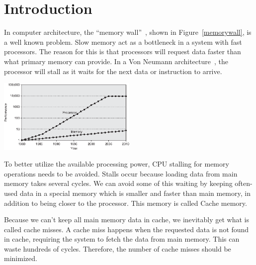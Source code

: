 \section{Introduction} %


In computer architecture, the ``memory wall''~\cite{wulf_mckee_1995},
shown in Figure~\ref{memorywall}, is a well known problem. Slow memory
act as a bottleneck in a system with fast processors. The reason for
this is that processors will request data faster than what primary
memory can provide. In a Von Neumann architecture~\cite{von1993first},
the processor will stall as it waits for the next data or instruction
to arrive.

\begin{center}
  \includegraphics[width=0.5\textwidth]{graphs/memorywall}
  \label{memorywall}
\end{center}

To better utilize the available processing power, CPU stalling for
memory operations needs to be avoided. Stalls occur because loading
data from main memory takes several cycles. We can avoid some of this
waiting by keeping often-used data in a special memory which is
smaller and faster than main memory, in addition to being closer to
the processor. This memory is called Cache memory.

Because we can't keep all main memory data in cache, we inevitably get
what is called cache misses. A cache miss happens when the requested
data is not found in cache, requiring the system to fetch the data
from main memory. This can waste hundreds of cycles. Therefore, the
number of cache misses should be minimized.



